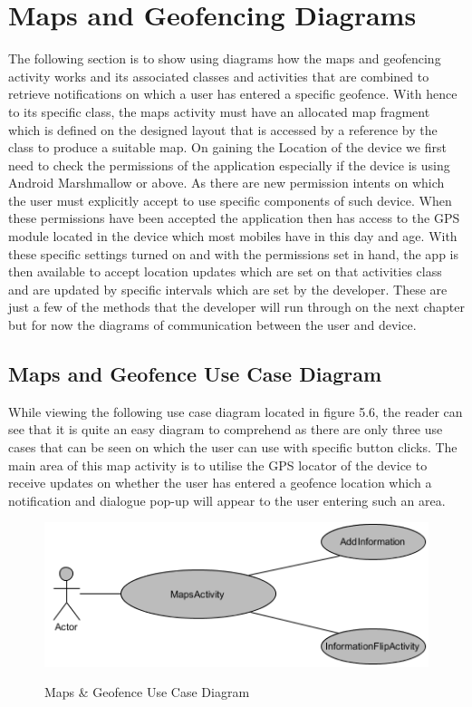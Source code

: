 \section{Maps and Geofencing Diagrams}
The following section is to show using diagrams how the maps and geofencing activity works and its associated classes and activities that are combined to retrieve notifications on which a user has entered a specific geofence. With hence to its specific class, the maps activity must have an allocated map fragment which is defined on the designed layout that is accessed by a reference by the class to produce a suitable map. On gaining the Location of the device we first need to check the permissions of the application especially if the device is using Android Marshmallow or above. As there are new permission intents on which the user must explicitly accept to use specific components of such device. When these permissions have been accepted the application then has access to the GPS module located in the device which most mobiles have in this day and age. With these specific settings turned on and with the permissions set in hand, the app is then available to accept location updates which are set on that activities class and are updated by specific intervals which are set by the developer. These are just a few of the methods that the developer will run through on the next chapter but for now the diagrams of communication between the user and device.

\subsection{Maps and Geofence Use Case Diagram}
While viewing the following use case diagram located in figure 5.6, the reader can see that it is quite an easy diagram to comprehend as there are only three use cases that can be seen on which the user can use with specific button clicks. The main area of this map activity is to utilise the GPS locator of the device to receive updates on whether the user has entered a geofence location which a notification and dialogue pop-up will appear to the user entering such an area.

\begin{figure}[htbp]
    \center \includegraphics[width=450pt]{MapsUsecase}\\
    \caption{Maps \& Geofence Use Case Diagram } \label{Figure: Maps & Geofence Use Case Diagram}
\end{figure}

